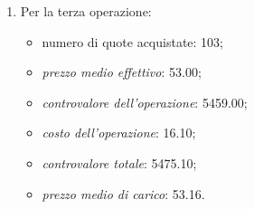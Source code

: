 \documentclass[12pt,a4paper]{article}
\newcommand{\Eur}[1]{\SI{#1}{\text{\euro{}}}}
\newcommand{\MediaPonderataDue}[4]{\frac{\num{#1} \times{} \num{#2} + \num{#3} \times{} \num{#4}}{\num{#1} + \num{#3}}}
\begin{document}
\begin{enumerate}
  Dopo la seconda operazione:
  \begin{itemize}
  \item numero quote nel saldo: \(101 + 102 = 203\);
  \item  il  \emph{prezzo  medio  effettivo  nel saldo}  è  la  media  ponderata  dei
    \emph{prezzi medi effettivi} del saldo precedente e del nuovo acquisto:
    \begin{equation*}
      \MediaPonderataDue{101}{51,00}{102}{52,00} = \Eur{51,50}
    \end{equation*}
  \item  il  \emph{prezzo  medio di  carico  nel  saldo}  è  la media  ponderata  dei
    \emph{prezzi medi di carico} del saldo precedente e del nuovo acquisto:
    \begin{equation*}
      \MediaPonderataDue{101}{51,15}{102}{52,15} = \Eur{51,66}
    \end{equation*}
  \end{itemize}
  il \emph{costo medio per quota nel saldo}:
  \begin{equation*}
    \frac{\num{51,66} - \num{51,50}}{\num{203}} = \Eur{0,1532}
  \end{equation*}

\item Per la terza operazione:
  \begin{itemize}
  \item numero di quote acquistate: \num{103};
  \item \emph{prezzo medio effettivo}: \Eur{53,00};
  \item \emph{controvalore dell'operazione}: \Eur{5459,00};
  \item \emph{costo dell'operazione}: \Eur{16,10};
  \item \emph{controvalore totale}: \Eur{5475,10};
  \item \emph{prezzo medio di carico}: \Eur{53,16}.
  \end{itemize}


\end{enumerate}
\end{document}
